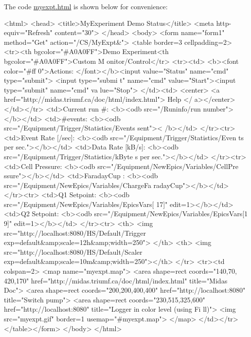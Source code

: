 The code \hyperlink{myexpt_8html}{myexpt.html} is shown below for convenience: 
\begin{DoxyCode}
<html>
  <head>
   <title>MyExperiment Demo Status</title>
   <meta http-equiv="Refresh" content="30">
  </head>
 <body>
  <form name="form1" method="Get" action="/CS/MyExpt&">
     <table border=3 cellpadding=2>
          <tr><th bgcolor="#A0A0FF">Demo Experiment<th bgcolor="#A0A0FF">Custom M
      onitor/Control</tr> 
          <tr><td> <b><font color="#ff 0">Actions: </font></b><input
                      value="Status" name="cmd" type="submit"> <input type="submi
      t"
                      name="cmd" value="Start"><input type="submit" name="cmd" va
      lue="Stop">
           </td><td>
           <center> <a href="http://midas.triumf.ca/doc/html/index.html"> Help </
      a></center>
           </td></tr>
           <td>Current run #: <b><odb src="/Runinfo/run number"></b></td>
           <td>#events: <b><odb src="/Equipment/Trigger/Statistics/Events sent"><
      /b></td>
           </tr><tr>
           <td>Event Rate [/sec]: <b><odb src="/Equipment/Trigger/Statistics/Even
      ts per sec."></b></td>
           <td>Data Rate [kB/s]: <b><odb src="/Equipment/Trigger/Statistics/kByte
      s per sec."></b></td>
            </tr><tr>
            <td>Cell Pressure: <b><odb src="/Equipment/NewEpics/Variables/CellPre
      ssure"></b></td>
           <td>FaradayCup   : <b><odb src="/Equipment/NewEpics/Variables/ChargeFa
      radayCup"></b></td>
           </tr><tr>
           <td>Q1 Setpoint: <b><odb src="/Equipment/NewEpics/Variables/EpicsVars[
      17]" edit=1></b></td>
          <td>Q2 Setpoint: <b><odb src="/Equipment/NewEpics/Variables/EpicsVars[1
      9]" edit=1></b></td>
          </tr><tr>
          <th> <img src="http://localhost:8080/HS/Default/Trigger%
                          exp=default&amp;scale=12h&amp;width=250">
          </th>
          <th> <img src="http://localhost:8080/HS/Default/Scaler%
                          exp=default&amp;scale=10m&amp;width=250"></th>
          </tr>
          <tr><td colspan=2>
          <map name="myexpt.map">
          <area shape=rect coords="140,70, 420,170" 
                  href="http://midas.triumf.ca/doc/html/index.html" title="Midas 
      Doc">
          <area shape=rect coords="200,200,400,400"
                  href="http://localhost:8080" title="Switch pump">
       <area shape=rect coords="230,515,325,600"
              href="http://localhost:8080" title="Logger in color level (using Fi
      ll)">
        <img src="myexpt.gif" border=1 usemap="#myexpt.map">
          </map>
          </td></tr>
     </table></form>
   </body>
  </html>  
\end{DoxyCode}



